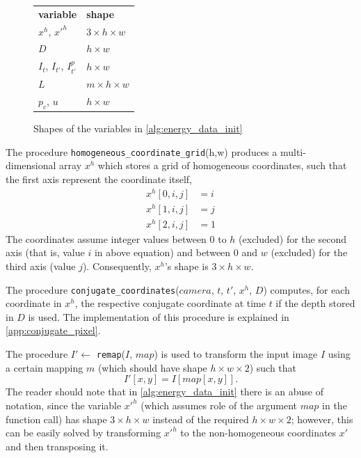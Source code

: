 \documentclass[notitlepage,english]{hgbreport}
\begin{document}
\begin{figure}
	\centering
	\begin{tabular}{|l  l|}\hline\hline
		\textbf{variable}&\textbf{shape}\\
		$x^h$, $x'^h$&  $3\times h\times w$\\
		$D$ & $h\times w$\\
		$I_t$, $I_{t'}$, $I^p_{t'}$&$h\times w$\\
		$L$&$m\times h \times w$\\
		$p_c$, $u$&$h\times w$\\\hline\hline
	\end{tabular}
	\caption{Shapes of the variables in \cref{alg:energy_data_init} }
\end{figure}

The procedure \texttt{homogeneous\_coordinate\_grid}(h,w) produces a multi-dimensional array $x^h$ which stores a grid of homogeneous coordinates, such that the first axis represent the coordinate itself, \ie 
\begin{align*}
 x^h[0,i,j] &= i\\
 x^h[1,i,j] &= j\\
 x^h[2,i,j] &= 1
\end{align*}
The coordinates assume integer values between $0$ to $h$ (excluded) for the second axis (that is, value $i$ in above equation) and between $0$ and $w$ (excluded) for the third axis (value $j$). Consequently, $x^h$'s shape is $3\times h \times w$.

The procedure \texttt{conjugate\_coordinates}($camera$, $t$, $t'$, $x^h$, $D$) computes, for each coordinate in $x^h$, the respective conjugate coordinate at time $t$ if the depth stored in $D$ is used. The implementation of this procedure is explained in \cref{app:conjugate_pixel}.

The procedure $I'\leftarrow$ \texttt{remap}($I$, $map$) is used to transform the input image $I$ using a certain mapping $m$ (which should have shape $h\times w\times 2$) such that
$$I'[x,y] = I[map[x,y]].$$
The reader should note that in \cref{alg:energy_data_init} there is an abuse of notation, since the variable $x'^h$ (which assumes role of the argument $map$ in the function call) has shape $3\times h \times w$ instead of the required $h\times w \times 2$; however, this can be easily solved by transforming $x'^h$ to the non-homogeneous coordinates $x'$ and then transposing it. 
\end{document}
